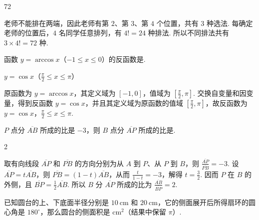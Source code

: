 \begin{answer}
72
\end{answer}

\begin{solution}
老师不能排在两端，因此老师有第 \(2\)、第 \(3\)、第 \(4\) 个位置，共有 \(3\) 种选法. 每确定老师的位置后，\(4\) 名同学任意排列，有 \(4!=24\) 种排法. 所以不同排法共有 \(3\times 4!=72\) 种.
\end{solution}

\begin{problem}
函数 \(y = \arccos x\)（\(-1 \leqslant x \leqslant 0\)）的反函数是\fillinblank{}.
\end{problem}

\begin{answer}
\(y = \cos x\)（\(\frac{\pi}{2} \leqslant x \leqslant \pi\)）
\end{answer}

\begin{solution}
原函数为 \(y=\arccos x\)，其定义域为 \([-1,0]\)，值域为 \(\left[\frac{\pi}{2},\pi\right]\). 交换自变量和因变量，得到反函数 \(y=\cos x\)，并且其定义域为原函数的值域 \(\left[\frac{\pi}{2},\pi\right]\)，故反函数为 \(y=\cos x\)，\(\frac{\pi}{2}\leqslant x\leqslant\pi\).
\end{solution}

\begin{problem}
\(P\) 点分 \(\overline{AB}\) 所成的比是 \(-3\)，则 \(B\) 点分 \(\overline{AP}\) 所成的比是\fillinblank{}.
\end{problem}

\begin{answer}
2
\end{answer}

\begin{solution}
取有向线段 \(\overline{AP}\) 和 \(\overline{PB}\) 的方向分别为从 \(A\) 到 \(P\)、从 \(P\) 到 \(B\)，则
\(\frac{\overline{AP}}{\overline{PB}}=-3\). 设 \(\overline{AP}=t\overline{AB}\)，则 \(\overline{PB}=(1-t)\overline{AB}\)，从而 \(\frac{t}{1-t}=-3\)，解得 \(t=\frac{3}{2}\). 因而 \(P\) 在 \(B\) 的外侧，且 \(\overline{BP}=\frac{1}{2}\overline{AB}\). 所以 \(B\) 分 \(\overline{AP}\) 所成的比为 \(\frac{\overline{AB}}{\overline{BP}}=2\).
\end{solution}

\begin{problem}
已知圆台的上、下底面半径分别是 \(10 \mathrm{~cm}\) 和 \(20 \mathrm{~cm}\)，它的侧面展开后所得扇环的圆心角是 \(180^{\circ}\)，那么圆台的侧面积是\fillinblank{} \(\mathrm{cm}^{2}\)（结果中保留 \(\pi\)）.
\end{problem}

